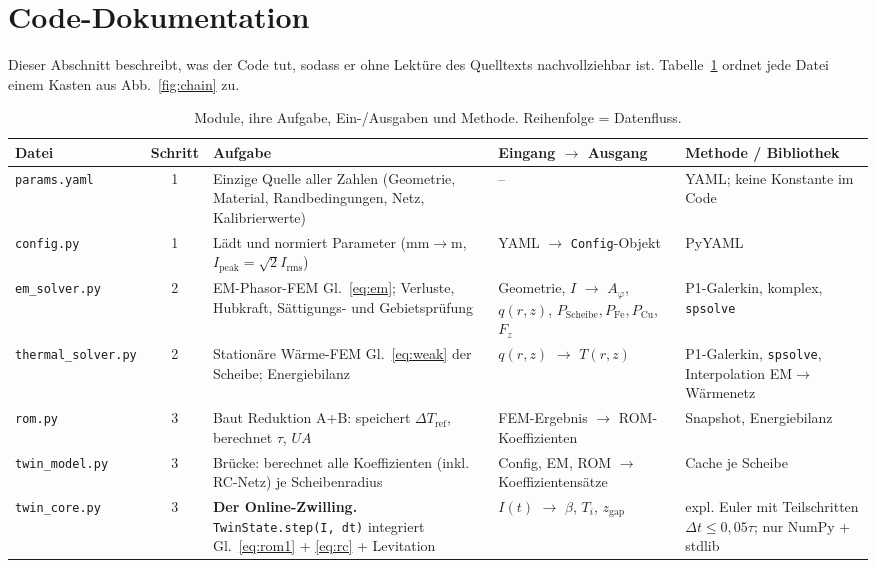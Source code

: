 \documentclass[a4paper, 10pt, conference]{ieeeconf}
\theoremstyle{remark}
\begin{document}
\section{Code-Dokumentation}
\label{sec:code}

Dieser Abschnitt beschreibt, was der Code tut, sodass er ohne Lektüre des
Quelltexts nachvollziehbar ist. Tabelle~\ref{tab:modules} ordnet jede Datei
einem Kasten aus Abb.~\ref{fig:chain} zu.

\begin{table}[t]
\centering\footnotesize
\caption{Module, ihre Aufgabe, Ein-/Ausgaben und Methode. Reihenfolge = Datenfluss.}
\label{tab:modules}
\begin{tabularx}{\textwidth}{@{}l c X X X@{}}
\toprule
Datei & Schritt & Aufgabe & Eingang $\to$ Ausgang & Methode / Bibliothek \\
\midrule
\texttt{params.yaml} & 1 & Einzige Quelle aller Zahlen (Geometrie, Material, Randbedingungen, Netz, Kalibrierwerte) & -- & YAML; keine Konstante im Code \\
\texttt{config.py} & 1 & Lädt und normiert Parameter (mm$\to$m, $I_{\mathrm{peak}}=\sqrt2I_{\mathrm{rms}}$) & YAML $\to$ \texttt{Config}-Objekt & PyYAML \\
\texttt{em\_solver.py} & 2 & EM-Phasor-FEM Gl.~\eqref{eq:em}; Verluste, Hubkraft, Sättigungs- und Gebietsprüfung & Geometrie, $I$ $\to$ $A_\varphi$, $q(r,z)$, $P_{\mathrm{Scheibe}}, P_{\mathrm{Fe}}, P_{\mathrm{Cu}}$, $F_z$ & P1-Galerkin, komplex, \texttt{spsolve} \\
\texttt{thermal\_solver.py} & 2 & Stationäre Wärme-FEM Gl.~\eqref{eq:weak} der Scheibe; Energiebilanz & $q(r,z)$ $\to$ $T(r,z)$ & P1-Galerkin, \texttt{spsolve}, Interpolation EM$\to$Wärmenetz \\
\texttt{rom.py} & 3 & Baut Reduktion A+B: speichert $\Delta T_{\mathrm{ref}}$, berechnet $\tau$, $UA$ & FEM-Ergebnis $\to$ ROM-Koeffizienten & Snapshot, Energiebilanz \\
\texttt{twin\_model.py} & 3 & Brücke: berechnet alle Koeffizienten (inkl. RC-Netz) je Scheibenradius & Config, EM, ROM $\to$ Koeffizientensätze & Cache je Scheibe \\
\texttt{twin\_core.py} & 3 & \textbf{Der Online-Zwilling.} \texttt{TwinState.step(I,\,dt)} integriert Gl.~\eqref{eq:rom1} + \eqref{eq:rc} + Levitation & $I(t)$ $\to$ $\beta$, $T_i$, $z_{\mathrm{gap}}$ & expl. Euler mit Teilschritten $\Delta t\le0{,}05\tau$; nur NumPy + stdlib \\

\end{tabularx}
\end{table}
\end{document}
